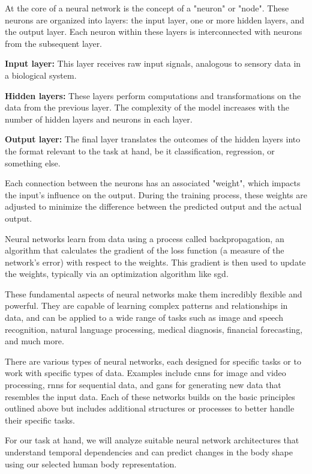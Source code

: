 At the core of a neural network is the concept of a "neuron" or "node". These
neurons are organized into layers: the input layer, one or more hidden layers,
and the output layer. Each neuron within these layers is interconnected with
neurons from the subsequent layer.

\textbf{Input layer:} This layer receives raw input signals,
analogous to sensory data in a biological system.

\textbf{Hidden layers:} These layers perform computations and transformations
on the data from the previous layer. The complexity of the model increases with
the number of hidden layers and neurons in each layer.

\textbf{Output layer:} The final layer translates the outcomes of the hidden
layers into the format relevant to the task at hand, be it classification,
regression, or something else.

Each connection between the neurons has an associated "weight", which impacts
the input's influence on the output. During the training process, these weights
are adjusted to minimize the difference between the predicted output and the
actual output.

Neural networks learn from data using a process called backpropagation, an
algorithm that calculates the gradient of the loss function (a measure of the
network's error) with respect to the weights. This gradient is then used to
update the weights, typically via an optimization algorithm like \gls{sgd}.

These fundamental aspects of neural networks make them incredibly flexible and
powerful. They are capable of learning complex patterns and relationships in
data, and can be applied to a wide range of tasks such as image and speech
recognition, natural language processing, medical diagnosis, financial
forecasting, and much more.

There are various types of neural networks, each designed for specific tasks or
to work with specific types of data. Examples include \glspl{cnn} for image and
video processing, \glspl{rnn} for sequential data, and \glspl{gan} for
generating new data that resembles the input data. Each of these networks
builds on the basic principles outlined above but includes additional
structures or processes to better handle their specific tasks.

For our task at hand, we will analyze suitable neural network architectures
that understand temporal dependencies and can predict changes in the body shape
using our selected human body representation.

